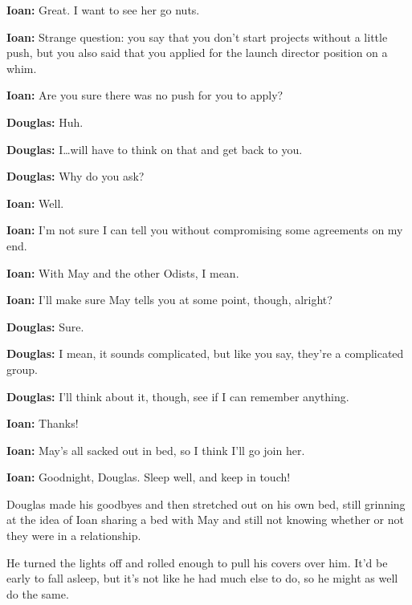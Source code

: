 \textbf{Ioan:} Great. I want to see her go nuts.

\textbf{Ioan:} Strange question: you say that you don't start projects without a little push, but you also said that you applied for the launch director position on a whim.

\textbf{Ioan:} Are you sure there was no push for you to apply?

\textbf{Douglas:} Huh.

\textbf{Douglas:} I\ldots will have to think on that and get back to you.

\textbf{Douglas:} Why do you ask?

\textbf{Ioan:} Well.

\textbf{Ioan:} I'm not sure I can tell you without compromising some agreements on my end.

\textbf{Ioan:} With May and the other Odists, I mean.

\textbf{Ioan:} I'll make sure May tells you at some point, though, alright?

\textbf{Douglas:} Sure.

\textbf{Douglas:} I mean, it sounds complicated, but like you say, they're a complicated group.

\textbf{Douglas:} I'll think about it, though, see if I can remember anything.

\textbf{Ioan:} Thanks!

\textbf{Ioan:} May's all sacked out in bed, so I think I'll go join her.

\textbf{Ioan:} Goodnight, Douglas. Sleep well, and keep in touch!

Douglas made his goodbyes and then stretched out on his own bed, still grinning at the idea of Ioan sharing a bed with May and still not knowing whether or not they were in a relationship.

He turned the lights off and rolled enough to pull his covers over him. It'd be early to fall asleep, but it's not like he had much else to do, so he might as well do the same.
